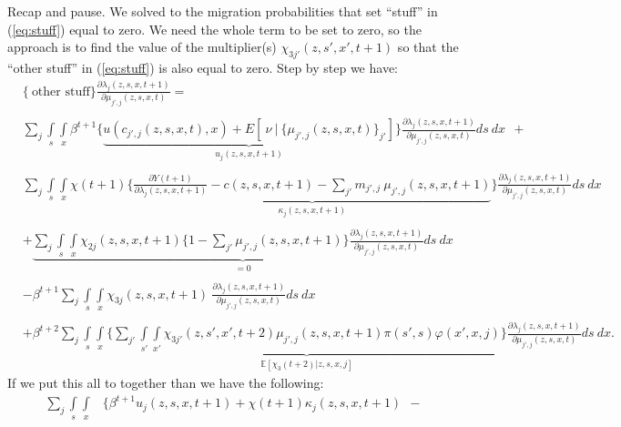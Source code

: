 \documentclass[12pt,pdftex]{article}
\begin{document}
\begin{onehalfspacing}
Recap and pause. We solved to the migration probabilities that set ``stuff'' in (\ref{eq:stuff}) equal to zero. We need the whole term to be set to zero, so the approach is to find the value of the multiplier(s) $\chi_{3j'}(z, s',x', t+1)$ so that the ``other stuff'' in (\ref{eq:stuff}) is also equal to zero. Step by step we have:
{\small
\begin{align}
& \bigg \{ \ \mbox{other \ stuff} \bigg \} \frac{\partial \lambda_{j}(z, s, x, t+1)}{\partial \mu_{j',j}(z, s, x,t)} =  \\
\nonumber \\
& \sum_{j}  \int\limits_{s} \int\limits_{x} \beta^{t+1} \bigg \{ \underbrace{u(c_{j',j}(z, s, x, t), x) + E[ \ \nu \ | \ \big\{\mu_{j',j}(z,s,x,t)\big\}_{j'}] }_{u_{j}(z,s,x,t+1)}\bigg \}  \frac{\partial \lambda_{j}(z, s, x, t+1)}{\partial \mu_{j',j}(z, s,x,t)} ds \ dx \ \ + \ \ \\
\nonumber \\
& \sum_{j} \int\limits_{s} \int\limits_{x}  \chi(t+1) \Bigg \{ \underbrace{\frac{\partial Y(t+1)}{\partial \lambda_{j}(z, s, x, t+1)} - c(z,s,x,t+1) - \sum_{j'}  m_{j',j} \ \mu_{j',j}(z, s, x, t+1)}_{\kappa_j(z, s, x, t+1)} \Bigg \} \frac{\partial \lambda_{j}(z,s,x, t+1)}{\partial \mu_{j',j}(z,s,x,t)} ds \ dx\\
\nonumber \\
& + \underbrace{\sum_{j} \int\limits_{s} \int\limits_{x} \chi_{2j}(z, s, x, t+1) \bigg \{1 - \sum_{j'} \mu_{j',j}(z, s,x,t+1) \bigg \} \frac{\partial \lambda_{j}(z,s,x, t+1)}{\partial \mu_{j',j}(z,s,x,t)} ds \ dx }_{ = 0} \\
\nonumber \\
& - \beta^{t+1} \sum_{j} \int\limits_{s} \int\limits_{x} \chi_{3j}(z, s, x, t+1) \ \frac{\partial \lambda_{j}(z, s, x,t+1)}{\partial \mu_{j',j}(z,s,x,t)} ds \ dx  \\
\nonumber \\
& + \beta^{t+2}\sum_{j} \int\limits_{s}  \int\limits_{x} \bigg \{ \underbrace{ \sum_{j'}  \int\limits_{s'} \int\limits_{x'} \chi_{3j'}(z, s',x', t+2) \mu_{j',j}(z, s, x, t+1) \pi(s',s) \varphi(x',x, j) }_{\mathbb{E}\left[\chi_{3}(t+2) |z, s, x, j \right]} \bigg \}  \frac{\partial \lambda_{j}(z, s, x, t+1)}{\partial \mu_{j',j}(z, s,x,t)} ds \ dx.
\end{align}}
If we put this all to together than we have the following:
{\small
\begin{align}
\sum_{j}  \int\limits_{s} \int\limits_{x} &\bigg \{ \beta^{t+1} u_{j}(z,s,x,t+1) + \chi(t+1) \kappa_j(z,s,x,t+1) \ \ - \ \ \\

\end{align}}
\end{onehalfspacing}
\end{document}
